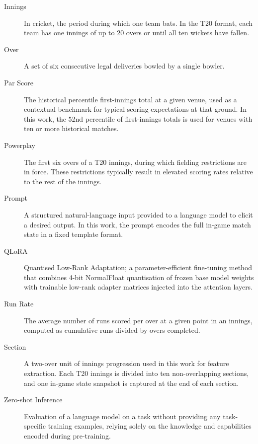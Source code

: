 \begin{description}
    \item[Innings]
    In cricket, the period during which one team bats. In the T20 format, each team has one innings of up to 20 overs or until all ten wickets have fallen.

    \item[Over]
    A set of six consecutive legal deliveries bowled by a single bowler.

    \item[Par Score]
    The historical percentile first-innings total at a given venue, used as a contextual benchmark for typical scoring expectations at that ground. In this work, the 52nd percentile of first-innings totals is used for venues with ten or more historical matches.

    \item[Powerplay]
    The first six overs of a T20 innings, during which fielding restrictions are in force. These restrictions typically result in elevated scoring rates relative to the rest of the innings.

    \item[Prompt]
    A structured natural-language input provided to a language model to elicit a desired output. In this work, the prompt encodes the full in-game match state in a fixed template format.

    \item[QLoRA]
    Quantised Low-Rank Adaptation; a parameter-efficient fine-tuning method that combines 4-bit NormalFloat quantisation of frozen base model weights with trainable low-rank adapter matrices injected into the attention layers.

    \item[Run Rate]
    The average number of runs scored per over at a given point in an innings, computed as cumulative runs divided by overs completed.

    \item[Section]
    A two-over unit of innings progression used in this work for feature extraction. Each T20 innings is divided into ten non-overlapping sections, and one in-game state snapshot is captured at the end of each section.

    \item[Zero-shot Inference]
    Evaluation of a language model on a task without providing any task-specific training examples, relying solely on the knowledge and capabilities encoded during pre-training.

\end{description}
